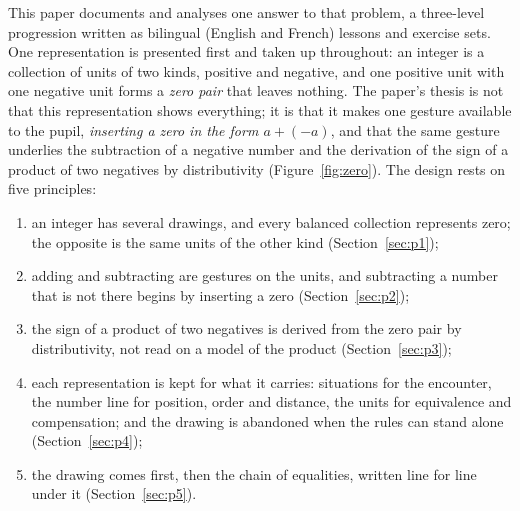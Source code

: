 \documentclass[11pt,a4paper]{article}
\theoremstyle{definition}
\begin{document}
This paper documents and analyses one answer to that problem, a three-level progression written as bilingual (English and French) lessons and exercise sets. One representation is presented first and taken up throughout: an integer is a collection of units of two kinds, positive and negative, and one positive unit with one negative unit forms a \emph{zero pair} that leaves nothing. The paper's thesis is not that this representation shows everything; it is that it makes one gesture available to the pupil, \emph{inserting a zero in the form $a+(-a)$}, and that the same gesture underlies the subtraction of a negative number and the derivation of the sign of a product of two negatives by distributivity (Figure~\ref{fig:zero}). The design rests on five principles:
\begin{enumerate}[label=(\roman*)]
  \item an integer has several drawings, and every balanced collection represents zero; the opposite is the same units of the other kind (Section~\ref{sec:p1});
  \item adding and subtracting are gestures on the units, and subtracting a number that is not there begins by inserting a zero (Section~\ref{sec:p2});
  \item the sign of a product of two negatives is derived from the zero pair by distributivity, not read on a model of the product (Section~\ref{sec:p3});
  \item each representation is kept for what it carries: situations for the encounter, the number line for position, order and distance, the units for equivalence and compensation; and the drawing is abandoned when the rules can stand alone (Section~\ref{sec:p4});
  \item the drawing comes first, then the chain of equalities, written line for line under it (Section~\ref{sec:p5}).
\end{enumerate}
\end{document}
